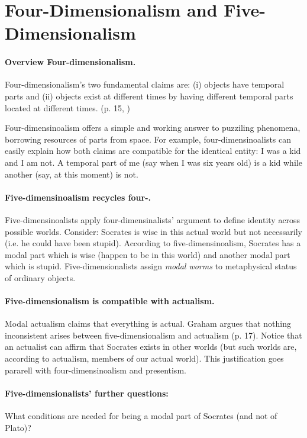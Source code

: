 \documentclass[
10pt, %
a4paper, %
twocolumn, %
landscape %
]{article}
\begin{document}
\section{Four-Dimensionalism and Five-Dimensionalism}
\paragraph{Overview Four-dimensionalism.}
Four-dimensionalism's two fundamental claims are:
(i) objects have temporal parts and (ii) objects exist at different times by having different temporal parts located at different times. (p. 15, \cite{Sider2001})

Four-dimensinoalism offers a simple and working answer to puzziling phenomena, borrowing resources of parts from space. For example, four-dimensinoalists can easily explain how both claims are compatible for the identical entity: I was a kid and I am not. A temporal part of me (say when I was six years old) is a kid while another (say, at this moment) is not.

\paragraph{Five-dimensinoalism recycles four-.}
Five-dimensinoalists apply four-dimensinalists' argument to define identity across possible worlds.
Consider: Socrates is wise in this actual world but not necessarily (i.e. he could have been stupid). According to five-dimensinoalism, Socrates has a modal part which is wise (happen to be in this world) and another modal part which is stupid.
Five-dimensionalists assign \emph{modal worms} to metaphysical status of ordinary objects.

\paragraph{Five-dimensionalism is compatible with actualism.}
Modal actualism claims that everything is actual.
Graham argues that nothing inconsistent arises between five-dimensionalism and actualism (p. 17). Notice that an actualist can affirm that Socrates exists in other worlds (but such worlds are, according to actualism, members of our actual world).
This justification goes pararell with four-dimensinoalism and presentism.

\paragraph{Five-dimensionalists' further questions:}
What conditions are needed for being a modal part of Socrates (and not of Plato)?
\end{document}
